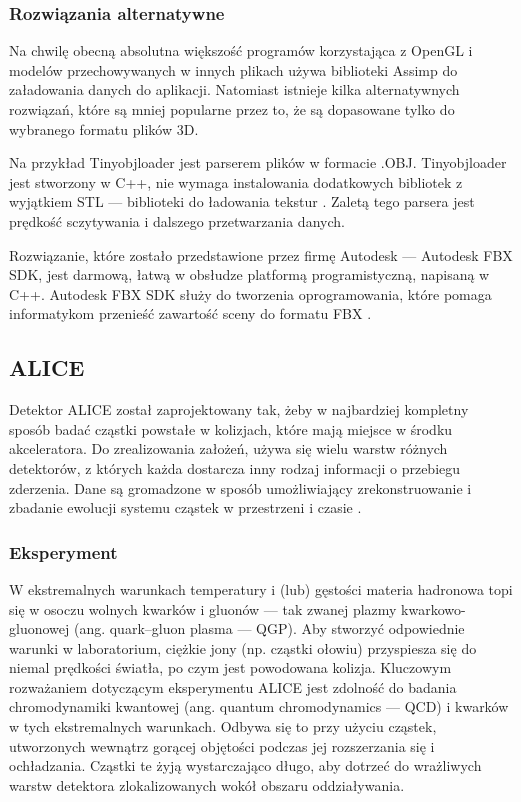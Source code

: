 \subsubsection{Rozwiązania alternatywne}
Na chwilę obecną absolutna większość programów korzystająca z OpenGL i modelów przechowywanych w innych plikach używa biblioteki Assimp do załadowania danych do aplikacji. Natomiast istnieje kilka alternatywnych rozwiązań, które są mniej popularne przez to, że są dopasowane tylko do wybranego formatu plików 3D.

Na przykład Tinyobjloader jest parserem plików w formacie .OBJ. Tinyobjloader jest stworzony w C++, nie wymaga instalowania dodatkowych bibliotek z wyjątkiem STL --- biblioteki do ładowania tekstur \cite{tinyobjloader}. Zaletą tego parsera jest prędkość sczytywania i dalszego przetwarzania danych. 

Rozwiązanie, które zostało przedstawione przez firmę Autodesk --- Autodesk FBX SDK, jest darmową, łatwą w obsłudze platformą programistyczną, napisaną w C++. Autodesk FBX SDK służy do tworzenia oprogramowania, które pomaga informatykom przenieść zawartość sceny do formatu FBX \cite{FBXSoftwareDevelopmentKit}.

\subsection{ALICE}
Detektor ALICE został zaprojektowany tak, żeby w najbardziej kompletny sposób badać cząstki powstałe w kolizjach, które mają miejsce w środku akceleratora. Do zrealizowania założeń, używa się wielu warstw różnych detektorów, z których każda dostarcza inny rodzaj informacji o przebiegu zderzenia. Dane są gromadzone w sposób umożliwiający zrekonstruowanie i zbadanie ewolucji systemu cząstek w przestrzeni i czasie \cite{aliceofficial}.

\subsubsection{Eksperyment}
W ekstremalnych warunkach temperatury i (lub) gęstości materia hadronowa topi się w osoczu wolnych kwarków i gluonów --- tak zwanej plazmy kwarkowo-gluonowej (ang. quark–gluon plasma --- QGP). Aby stworzyć odpowiednie warunki w laboratorium, ciężkie jony (np. cząstki ołowiu) przyspiesza się do niemal prędkości światła, po czym jest powodowana kolizja. Kluczowym rozważaniem dotyczącym eksperymentu ALICE jest zdolność do badania chromodynamiki kwantowej (ang.  quantum chromodynamics --- QCD) i kwarków w tych ekstremalnych warunkach. Odbywa się to przy użyciu cząstek, utworzonych wewnątrz gorącej objętości podczas jej rozszerzania się i ochładzania. Cząstki te żyją wystarczająco długo, aby dotrzeć do wrażliwych warstw detektora zlokalizowanych wokół obszaru oddziaływania.

